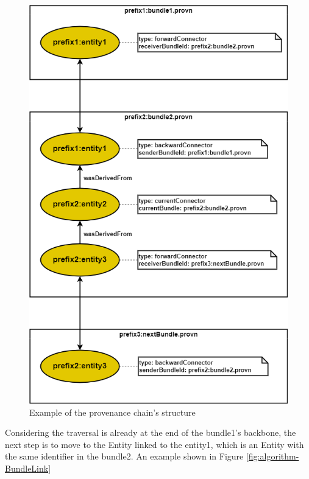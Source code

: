 \documentclass[
  digital,     %
  oneside,     %
  nosansbold,  %
  nocolorbold, %
  lof,         %
  lot,         %
]{fithesis4}
\begin{document}
\begin{figure}[htbp]
  \begin{center}
    \includegraphics[width=11.5cm]{fithesis/images/algorithm-Chain.png}
  \end{center}
  \caption{Example of the provenance chain's structure}
  \label{fig:algorithm-Chain}
\end{figure}
\shorthandon{-}

Considering the traversal is already at the end of the bundle1's backbone, the next step is to move to the Entity linked to the entity1, which is an Entity with the same identifier in the bundle2. An example shown in Figure \ref{fig:algorithm-BundleLink}
\end{document}
